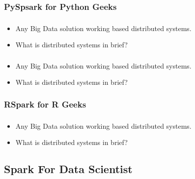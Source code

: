 \subsubsection{PySpsark for Python Geeks}

\begin{frame}
  \frametitle{\subsecname}
	\begin{itemize} 
		\item Any Big Data solution working based distributed systems.
		\item What is distributed systems in brief?
	\end{itemize}
\end{frame}


\begin{frame}
  \frametitle{\subsecname}
	\begin{itemize} 
		\item Any Big Data solution working based distributed systems.
		\item What is distributed systems in brief?
	\end{itemize}
\end{frame}

\subsubsection{RSpark for R Geeks}

\begin{frame}
  \frametitle{\subsecname}
	\begin{itemize} 
		\item Any Big Data solution working based distributed systems.
		\item What is distributed systems in brief?
	\end{itemize}
\end{frame}


\subsection{Spark For Data Scientist}


